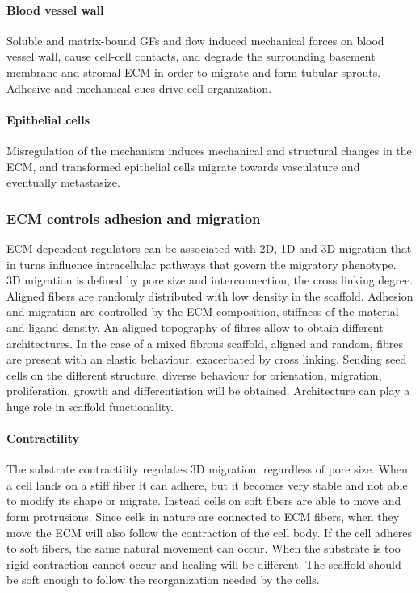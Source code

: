 			\paragraph{Blood vessel wall}
			Soluble and matrix-bound GFs and flow induced mechanical forces on blood vessel wall, cause cell-cell contacts, and degrade the surrounding basement membrane and stromal ECM in order to migrate and form tubular sprouts.
			Adhesive and mechanical cues drive cell organization.

			\paragraph{Epithelial cells}
			Misregulation of the mechanism induces mechanical and structural changes in the ECM, and transformed epithelial cells migrate towards vasculature and eventually metastasize.

		\subsubsection{ECM controls adhesion and migration}
		ECM-dependent regulators can be associated with 2D, 1D and 3D migration that in turns influence intracellular pathways that govern the migratory phenotype.
		3D migration is defined by pore size and interconnection, the cross linking degree.
		Aligned fibers are randomly distributed with low density in the scaffold.
		Adhesion and migration are controlled by the ECM composition, stiffness of the material and ligand density.
		An aligned topography of fibres allow to obtain different architectures.
		In the case of a mixed fibrous scaffold, aligned and random, fibres are present with an elastic behaviour, exacerbated by cross linking.
		Sending seed cells on the different structure, diverse behaviour for orientation, migration, proliferation, growth and differentiation will be obtained.
		Architecture can play a huge role in scaffold functionality.

			\paragraph{Contractility}
			The substrate contractility regulates 3D migration, regardless of pore size.
			When a cell lands on a stiff fiber it can adhere, but it becomes very stable and not able to modify its shape or migrate.
			Instead cells on soft fibers are able to move and form protrusions.
			Since cells in nature are connected to ECM fibers, when they move the ECM will also follow the contraction of the cell body.
			If the cell adheres to soft fibers, the same natural movement can occur.
			When the substrate is too rigid contraction cannot occur and healing will be different.
			The scaffold should be soft enough to follow the reorganization needed by the cells.

